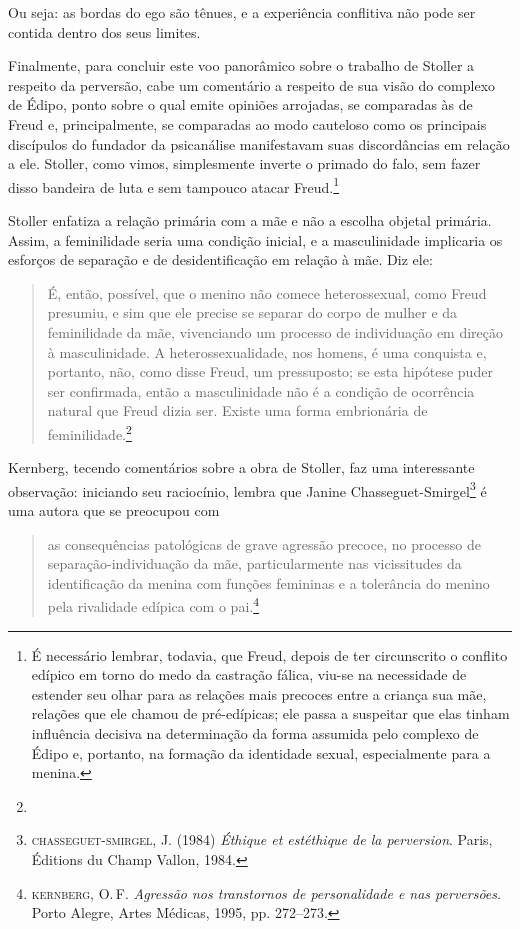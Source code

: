 Ou seja: as bordas do ego são tênues, e a experiência conflitiva não
pode ser contida dentro dos seus limites.

Finalmente, para concluir este voo panorâmico sobre o trabalho de
Stoller a respeito da perversão, cabe um comentário a respeito de sua
visão do complexo de Édipo, ponto sobre o qual emite opiniões arrojadas,
se comparadas às de Freud e, principalmente, se comparadas ao modo
cauteloso como os principais discípulos do fundador da psicanálise
manifestavam suas discordâncias em relação a ele. Stoller, como vimos,
simplesmente inverte o primado do falo, sem fazer disso bandeira de luta
e sem tampouco atacar Freud.\footnote{É necessário lembrar, todavia, que
  Freud, depois de ter circunscrito o conflito edípico em torno do medo
  da castração fálica, viu-se na necessidade de estender seu olhar para
  as relações mais precoces entre a criança sua mãe, relações que ele
  chamou de pré-edípicas; ele passa a suspeitar que elas tinham
  influência decisiva na determinação da forma assumida pelo complexo de
  Édipo e, portanto, na formação da identidade sexual, especialmente
  para a menina.}

Stoller enfatiza a relação primária com a mãe e não a escolha objetal
primária. Assim, a feminilidade seria uma condição inicial, e a
masculinidade implicaria os esforços de separação e de desidentificação
em relação à mãe. Diz ele:

\begin{quote}
É, então, possível, que o menino não comece heterossexual, como Freud
presumiu, e sim que ele precise se separar do corpo de mulher e da
feminilidade da mãe, vivenciando um processo de individuação em direção
à masculinidade. A heterossexualidade, nos homens, é uma conquista e,
portanto, não, como disse Freud, um pressuposto; se esta hipótese puder
ser confirmada, então a masculinidade não é a condição de ocorrência
natural que Freud dizia ser. Existe uma forma embrionária de
feminilidade.\footnote{}
\end{quote}

Kernberg, tecendo comentários sobre a obra de Stoller, faz uma
interessante observação: iniciando seu raciocínio, lembra que Janine
Chasseguet-Smirgel\footnote{\textsc{chasseguet-smirgel}, J. (1984)
  \emph{Éthique et estéthique de la perversion}. Paris, Éditions du
  Champ Vallon, 1984.} é uma autora que se preocupou com

\begin{quote}
as consequências patológicas de grave agressão precoce, no processo de
separação-individuação da mãe, particularmente nas vicissitudes da
identificação da menina com funções femininas e a tolerância do menino
pela rivalidade edípica com o pai.\footnote{\textsc{kernberg}, O.\,F.
  \emph{Agressão nos transtornos de personalidade e nas perversões}.
  Porto Alegre, Artes Médicas, 1995, pp. 272--273.}
\end{quote}

